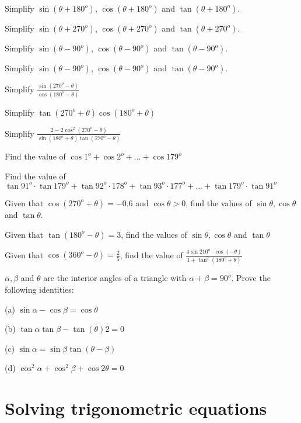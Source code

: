 \documentclass[11pt,letterpaper]{article}
\newcounter{problem}
\begin{document}
\begin{problemslist}
\item Simplify $\sin(\theta+180^o)$, $\cos(\theta+180^o)$ and $\tan(\theta+180^o)$.
\item Simplify $\sin(\theta+270^o)$, $\cos(\theta+270^o)$ and $\tan(\theta+270^o)$.
\item Simplify $\sin(\theta-90^o)$, $\cos(\theta-90^o)$ and $\tan(\theta-90^o)$.
\item Simplify $\sin(\theta-90^o)$, $\cos(\theta-90^o)$ and $\tan(\theta-90^o)$.
\item Simplify $\frac{\sin(270^o - \theta)}{\cos(180^o-\theta)}$
\item Simplify $\tan(270^o+\theta) \cos(180^o+\theta)$
\item Simplify $\frac{2-2\cos^2(270^o-\theta)}{\sin(180^o+\theta)\tan(270^o-\theta)}$
\item Find the value of $\cos 1^o + \cos 2^o + ... + \cos 179^o$
\item Find the value of $\tan 91^o \cdot \tan 179^o + \tan 92^o \cdot 178^o + \tan 93^o \cdot 177^o + ... + \tan 179^o \cdot \tan 91^o$
\item Given that $\cos (270^o + \theta) = -0.6$ and $\cos \theta > 0$, find the values of $\sin \theta, \cos \theta$ and $\tan \theta$.
\item Given that $\tan (180^o - \theta) = 3$, find the values of $\sin \theta, \cos \theta$ and $\tan \theta$
\item Given that $\cos (360^o - \theta) = \frac{2}{5}$, find the value of $\frac{4 \sin 210^o \cdot \cos (-\theta)}{1 + \tan^2(180^o + \theta)}$
\item $\alpha, \beta$ and $\theta$ are the interior angles of a triangle with $\alpha + \beta = 90^o$. Prove the following identities:

	(a) $\sin \alpha - \cos \beta = \cos \theta$

	(b) $\tan \alpha \tan \beta - \tan (\theta){2} = 0$

	(c) $\sin \alpha = \sin \beta \tan (\theta - \beta)$

	(d) $\cos^2 \alpha + \cos^2 \beta + \cos 2\theta = 0$

\end{problemslist}

\section{Solving trigonometric equations}
\end{document}
